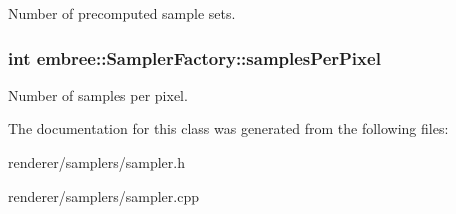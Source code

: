 Number of precomputed sample sets. 

\hypertarget{classembree_1_1_sampler_factory_ae275dc3161d4a7c2a5643abf5bdcd1ef}{
\subsubsection[{samplesPerPixel}]{\setlength{\rightskip}{0pt plus 5cm}int {\bf embree::SamplerFactory::samplesPerPixel}}}
\label{classembree_1_1_sampler_factory_ae275dc3161d4a7c2a5643abf5bdcd1ef}


Number of samples per pixel. 



The documentation for this class was generated from the following files:\begin{DoxyCompactItemize}
\item 
renderer/samplers/sampler.h\item 
renderer/samplers/sampler.cpp\end{DoxyCompactItemize}
